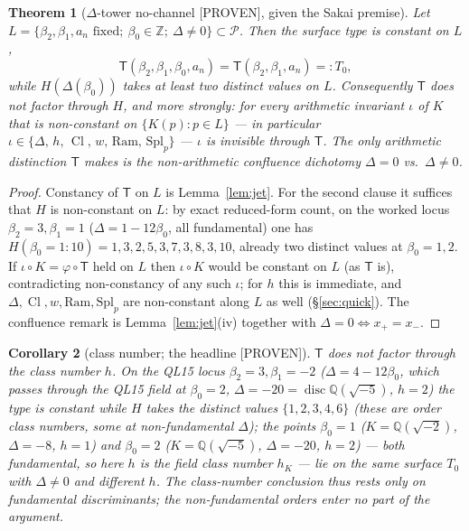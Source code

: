 \documentclass[11pt]{article}
\newtheorem{theorem}{Theorem}
\newtheorem{corollary}[theorem]{Corollary}
\theoremstyle{definition}
\newcommand{\Q}{\mathbb{Q}}
\newcommand{\Z}{\mathbb{Z}}
\newcommand{\Cl}{\operatorname{Cl}}
\newcommand{\disc}{\operatorname{disc}}
\newcommand{\Tch}{\mathsf{T}}
\newcommand{\PROVEN}{\textsf{[PROVEN]}}
\begin{document}
\begin{theorem}[$\Delta$-tower no-channel \PROVEN, given the Sakai premise]\label{thm:main}
Let $L=\{\beta_2,\beta_1,a_n\text{ fixed};\ \beta_0\in\Z;\ \Delta\neq0\}\subset
\mathcal P$. Then the surface type is constant on $L$,
\[
  \Tch(\beta_2,\beta_1,\beta_0,a_n)=\Tch(\beta_2,\beta_1,a_n)=:T_0 ,
\]
while $H(\Delta(\beta_0))$ takes at least two distinct values on $L$. Consequently
$\Tch$ does not factor through $H$, and more strongly: for \emph{every} arithmetic
invariant $\iota$ of $K$ that is non-constant on $\{K(p):p\in L\}$ --- in particular
$\iota\in\{\Delta,\,h,\,\Cl,\,w,\,\mathrm{Ram},\,\mathrm{Spl}_p\}$ --- $\iota$ is
\emph{invisible through $\Tch$}. The only arithmetic distinction $\Tch$ makes is the
non-arithmetic confluence dichotomy $\Delta=0$ vs.\ $\Delta\neq0$.
\end{theorem}

\begin{proof}
Constancy of $\Tch$ on $L$ is Lemma~\ref{lem:jet}. For the second clause it suffices
that $H$ is non-constant on $L$: by exact reduced-form count, on the worked locus
$\beta_2=3,\beta_1=1$ ($\Delta=1-12\beta_0$, all fundamental) one has
$H(\beta_0{=}1{:}10)=1,3,2,5,3,7,3,8,3,10$, already two distinct values at
$\beta_0=1,2$. If $\iota\circ K=\varphi\circ\Tch$ held on $L$ then $\iota\circ K$
would be constant on $L$ (as $\Tch$ is), contradicting non-constancy of any such
$\iota$; for $h$ this is immediate, and $\Delta,\Cl,w,\mathrm{Ram},\mathrm{Spl}_p$ are
non-constant along $L$ as well (\S\ref{sec:quick}). The confluence remark is
Lemma~\ref{lem:jet}(iv) together with $\Delta=0\Leftrightarrow x_+=x_-$.
\end{proof}

\begin{corollary}[class number; the headline \PROVEN]\label{cor:h}
$\Tch$ does not factor through the class number $h$. On the QL15 locus
$\beta_2=3,\beta_1=-2$ ($\Delta=4-12\beta_0$, which passes through the QL15 field at
$\beta_0=2$, $\Delta=-20=\disc\Q(\sqrt{-5})$, $h=2$) the type is constant while
$H$ takes the distinct values $\{1,2,3,4,6\}$ (these are order class numbers, some at
non-fundamental $\Delta$); the points $\beta_0=1$
($K=\Q(\sqrt{-2})$, $\Delta=-8$, $h=1$) and $\beta_0=2$ ($K=\Q(\sqrt{-5})$,
$\Delta=-20$, $h=2$) --- \emph{both fundamental}, so here $h$ is the field class
number $h_K$ --- lie on the same surface $T_0$ with $\Delta\neq0$ and different $h$.
The class-number conclusion thus rests only on fundamental discriminants; the
non-fundamental orders enter no part of the argument.
\end{corollary}
\end{document}
